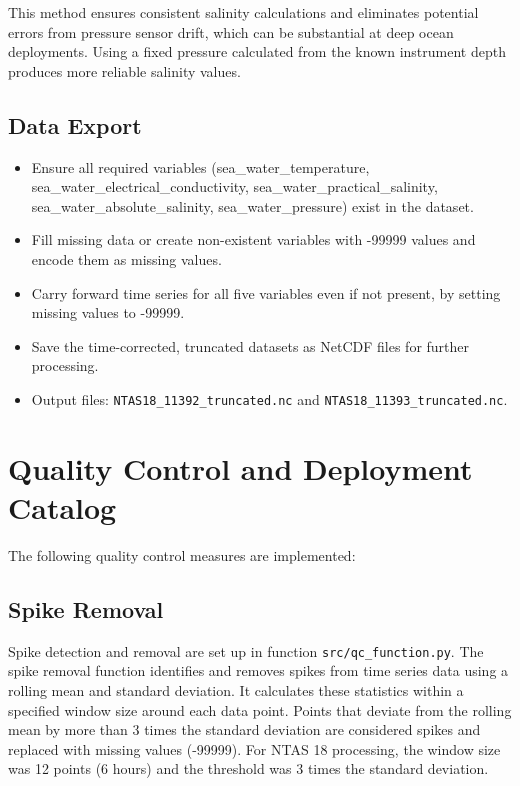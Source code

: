 \documentclass[11pt]{article}
\newcommand{\projectname}{NTAS}  %
\newcommand{\casenumber}{18}  %
\newcommand{\FirstInstrument}{11392}
\newcommand{\SecondInstrument}{11393}
\newcommand{\WindowSize}{12}  %
\newcommand{\ThresholdValue}{3}  %
\begin{document}
This method ensures consistent salinity calculations and eliminates potential errors from pressure sensor drift, 
which can be substantial at deep ocean deployments. 
Using a fixed pressure calculated from the known instrument depth produces more reliable salinity values.

\subsection{Data Export}

\begin{itemize}
\item Ensure all required variables (sea\_water\_temperature, sea\_water\_electrical\_conductivity, sea\_water\_practical\_salinity, sea\_water\_absolute\_salinity, sea\_water\_pressure) exist in the dataset.
\item Fill missing data or create non-existent variables with -99999 values and encode them as missing values.
\item Carry forward time series for all five variables even if not present, by setting missing values to -99999.
\item Save the time-corrected, truncated datasets as NetCDF files for further processing.
\item Output files: 
\texttt{\projectname\casenumber\_\FirstInstrument\_truncated.nc}
and \texttt{\projectname\casenumber\_\SecondInstrument\_truncated.nc}.
\end{itemize}


\section{Quality Control and Deployment Catalog}
The following quality control measures are implemented:

\subsection{Spike Removal}
Spike detection and removal are set up in function \texttt{src/qc\_function.py}. 
The spike removal function identifies and removes spikes from time series data using a rolling mean and standard deviation. 
It calculates these statistics within a specified window size around each data point. 
Points that deviate from the rolling mean by more than \ThresholdValue{} times the standard deviation are considered spikes and replaced with missing values (-99999). 
For \projectname{} \casenumber{} processing, the window size was \WindowSize{} points (6 hours) and the threshold was \ThresholdValue{} times the standard deviation.
\end{document}
